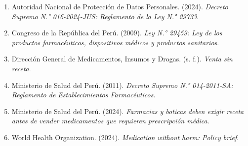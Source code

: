 \documentclass[11pt,a4paper]{article}
\begin{document}
\begin{enumerate}[leftmargin=1.6em,itemsep=0.55em]
    \item Autoridad Nacional de Protección de Datos Personales. (2024). \textit{Decreto Supremo N.° 016-2024-JUS: Reglamento de la Ley N.° 29733}.
    \item Congreso de la República del Perú. (2009). \textit{Ley N.° 29459: Ley de los productos farmacéuticos, dispositivos médicos y productos sanitarios}.
    \item Dirección General de Medicamentos, Insumos y Drogas. (s. f.). \textit{Venta sin receta}.
    \item Ministerio de Salud del Perú. (2011). \textit{Decreto Supremo N.° 014-2011-SA: Reglamento de Establecimientos Farmacéuticos}.
    \item Ministerio de Salud del Perú. (2024). \textit{Farmacias y boticas deben exigir receta antes de vender medicamentos que requieren prescripción médica}.
    \item World Health Organization. (2024). \textit{Medication without harm: Policy brief}.
\end{enumerate}
\end{document}
